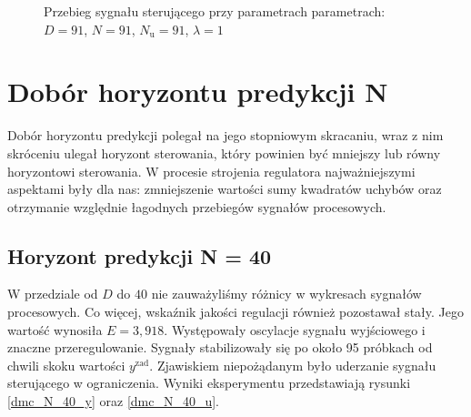 \begin{figure}[H]
    \centering
    \caption{Przebieg sygnału sterującego przy parametrach parametrach: $D = 91$, $N = 91$, $N_{\mathrm{u}} = 91$, $\lambda = 1$}
    \label{dmc_start_ster}
\end{figure}


\section{Dobór horyzontu predykcji N}
\label{zad_dobor_N}
Dobór horyzontu predykcji polegał na jego stopniowym skracaniu, wraz z nim skróceniu ulegał horyzont sterowania, który powinien być mniejszy lub równy horyzontowi sterowania. W procesie strojenia regulatora najważniejszymi aspektami były dla nas: zmniejszenie wartości sumy kwadratów uchybów oraz otrzymanie względnie łagodnych przebiegów sygnałów procesowych.

\subsection{Horyzont predykcji N = 40}
W przedziale od $D$ do $40$ nie zauważyliśmy różnicy w wykresach sygnałów procesowych. Co więcej, wskaźnik jakości regulacji również pozostawał stały. Jego wartość wynosiła $E = 3,918$. Występowały oscylacje sygnału wyjściowego i znaczne przeregulowanie. Sygnały stabilizowały się po około 95 próbkach od chwili skoku wartości $y^{\mathrm{zad}}$. Zjawiskiem niepożądanym było uderzanie sygnału sterującego w ograniczenia. Wyniki eksperymentu przedstawiają rysunki \ref{dmc_N_40_y} oraz \ref{dmc_N_40_u}.

